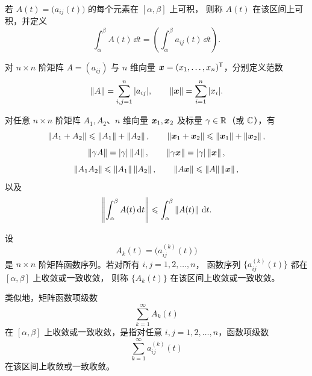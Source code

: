 若 $A(t)=\bigl(a_{ij}(t)\bigr)$ 的每个元素在 $[\alpha,\beta]$ 上可积，
则称 $A(t)$ 在该区间上可积，并定义
\[
	\int_\alpha^\beta A(t)\,\dd t
	=\left(\int_\alpha^\beta a_{ij}(t)\,\dd t\right).
\]

\begin{definition}\label{def:矩阵与向量的范数}
	对 $n\times n$ 阶矩阵 $A=(a_{ij})$ 与 $n$ 维向量
	$\boldsymbol{x}=(x_1,\ldots,x_n)^{\mathsf T}$，分别定义范数
	\[
		\left\| A \right\|=\sum_{i,j=1}^{n}|a_{ij}|,
		\qquad
		\left\| \boldsymbol{x} \right\|=\sum_{i=1}^{n}|x_i|.
	\]
\end{definition}

对任意 $n\times n$ 阶矩阵 $A_1,A_2$、$n$ 维向量
$\boldsymbol{x}_1,\boldsymbol{x}_2$ 及标量 $\gamma\in\mathbb{R}$（或 $\mathbb{C}$），有
\[
	\left\| A_1+A_2 \right\|\leqslant\left\| A_1 \right\|+\left\| A_2 \right\|,
	\qquad
	\left\| \boldsymbol{x}_1+\boldsymbol{x}_2 \right\|
	\leqslant\left\| \boldsymbol{x}_1 \right\|+\left\| \boldsymbol{x}_2 \right\|,
\]
\[
	\left\| \gamma A \right\|=|\gamma|\left\| A \right\|,
	\qquad
	\left\| \gamma\boldsymbol{x} \right\|=|\gamma|\left\| \boldsymbol{x} \right\|,
\]
\[
	\left\| A_1A_2 \right\|\leqslant\left\| A_1 \right\|\left\| A_2 \right\|,
	\qquad
	\left\| A\boldsymbol{x} \right\|\leqslant\left\| A \right\|\left\| \boldsymbol{x} \right\|,
\]
以及
\[
	\left\| \int_\alpha^\beta A(t)\,\mathrm{d} t \right\|
	\leqslant
	\int_\alpha^\beta\left\| A(t) \right\|\,\mathrm{d} t.
\]

\begin{definition}\label{def:矩阵函数序列的收敛}
	设
	\[
		A_k(t)=\bigl(a_{ij}^{(k)}(t)\bigr)
	\]
	是 $n\times n$ 阶矩阵函数序列。若对所有 $i,j=1,2,\ldots,n$，
	函数序列 $\{a_{ij}^{(k)}(t)\}$ 都在 $[\alpha,\beta]$ 上收敛或一致收敛，
	则称 $\{A_k(t)\}$ 在该区间上收敛或一致收敛。

	类似地，矩阵函数项级数
	\[
		\sum_{k=1}^{\infty}A_k(t)
	\]
	在 $[\alpha,\beta]$ 上收敛或一致收敛，是指对任意
	$i,j=1,2,\ldots,n$，函数项级数
	\[
		\sum_{k=1}^{\infty}a_{ij}^{(k)}(t)
	\]
	在该区间上收敛或一致收敛。
\end{definition}

